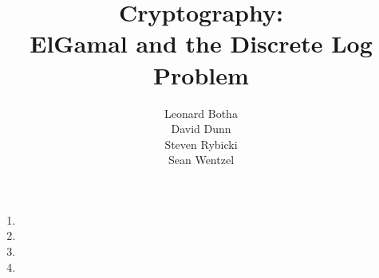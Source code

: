 \documentclass[12pt,a4paper]{article}
\title{{\bf Cryptography:}\\
ElGamal and the Discrete Log Problem}
\author{Leonard Botha \\
David Dunn \\
Steven Rybicki\\
Sean Wentzel}
\begin{document}
\maketitle
\begin{enumerate}
\item 
\item 
\item 
\item 
\end{enumerate}

\end{document}
